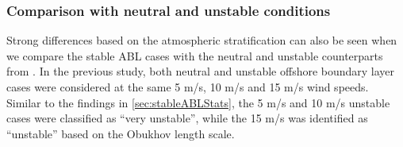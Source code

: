 



\subsubsection{Comparison with neutral and unstable conditions}

Strong differences based on the atmospheric stratification can also be
seen when we compare the stable ABL cases with the neutral and
unstable counterparts from \cite{cheung2020large}.  In the previous
study, both neutral and unstable offshore boundary layer cases were
considered at the same 5 m/s, 10 m/s and 15 m/s wind speeds.  Similar
to the findings in \ref{sec:stableABLStats}, the 5 m/s and 10 m/s
unstable cases were classified as ``very unstable'', while the 15 m/s
was identified as ``unstable'' based on the Obukhov length scale.

